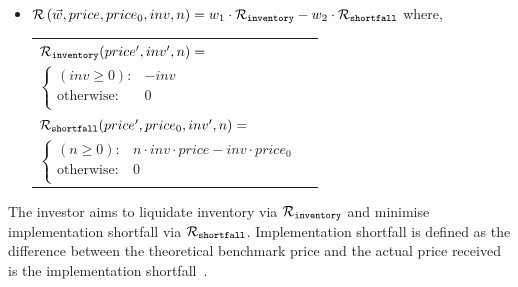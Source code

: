 \begin{itemize}
{\begin{tabular}{ll}
        \end{tabular}
    }%
    \item {\footnotesize $ \mathcal{R}\left(\vec{w}, price, price_0, inv, n \right) = w_1 \cdot \mathcal{R}_{\mathtt{inventory}} - w_2 \cdot \mathcal{R}_{\mathtt{shortfall}} $} where, \\
    {\footnotesize 
        \abovedisplayskip=10pt
        \belowdisplayskip=0pt
        \renewcommand{\arraystretch}{1.5}
        \begin{tabular}{ll}    
            $ \mathcal{R}_{\mathtt{inventory}}(price', inv', n) = $ &  $ $ \\
                \qquad $ \begin{cases}
                (inv \geq 0) : & -inv \\
                \text{otherwise} : & 0 \\
                \end{cases} $ & $ $ \\           
            $ \mathcal{R}_{\mathtt{shortfall}}(price', price_0, inv', n) = $ &  $ $ \\
                \qquad $ \begin{cases}
                (n \geq 0) : & n \cdot inv \cdot price - inv \cdot price_0 \\
                \text{otherwise} : & 0 \\
                \end{cases} $ & $ $ \\           
        \end{tabular}
    }    
\end{itemize}

The investor aims to liquidate inventory via {\footnotesize $ \mathcal{R}_{\mathtt{inventory}} $} and minimise implementation shortfall via {\footnotesize $ \mathcal{R}_{\mathtt{shortfall}} $}. Implementation shortfall is defined as the difference
between the theoretical benchmark price and the actual price received is the implementation shortfall~\parencite{Perold_JPM_1988}.

